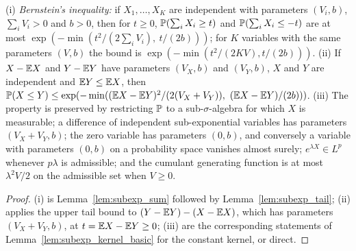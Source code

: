 \begin{lemma}\label{lem:subexp_measure_more}
\leanok
{}
(i) \emph{Bernstein's inequality:} if $X_1,\dots,X_K$ are independent with parameters
$(V_i, b)$, $\sum_iV_i > 0$ and $b > 0$, then for $t \ge 0$, $\mathbb{P}(\sum_iX_i \ge t)$ and
$\mathbb{P}(\sum_iX_i \le -t)$ are at most $\exp(-\min(t^2/(2\sum_iV_i),\ t/(2b)))$; for $K$
variables with the same parameters $(V, b)$ the bound is $\exp(-\min(t^2/(2KV), t/(2b)))$.
(ii) If $X - \mathbb{E} X$ and $Y - \mathbb{E} Y$ have parameters $(V_X, b)$ and $(V_Y, b)$, $X$ and $Y$ are
independent and $\mathbb{E} Y \le \mathbb{E} X$, then
$\mathbb{P}(X \le Y) \le \exp(-\min((\mathbb{E} X - \mathbb{E} Y)^2/(2(V_X+V_Y)),\ (\mathbb{E} X - \mathbb{E} Y)/(2b)))$.
(iii) The property is preserved by restricting $\mathbb{P}$ to a sub-$\sigma$-algebra for which
$X$ is measurable; a difference of independent sub-exponential variables has parameters
$(V_X + V_Y, b)$; the zero variable has parameters $(0, b)$, and conversely a variable with
parameters $(0, b)$ on a probability space vanishes almost surely; $e^{\lambda X} \in L^p$
whenever $p\lambda$ is admissible; and the cumulant generating function is at most
$\lambda^2V/2$ on the admissible set when $V \ge 0$.
\end{lemma}

\begin{proof}
\leanok
{}
(i) is Lemma~\ref{lem:subexp_sum} followed by Lemma~\ref{lem:subexp_tail}; (ii) applies the
upper tail bound to $(Y - \mathbb{E} Y) - (X - \mathbb{E} X)$, which has parameters $(V_X + V_Y, b)$, at
$t = \mathbb{E} X - \mathbb{E} Y \ge 0$; (iii) are the corresponding statements of
Lemma~\ref{lem:subexp_kernel_basic} for the constant kernel, or direct.
\end{proof}

